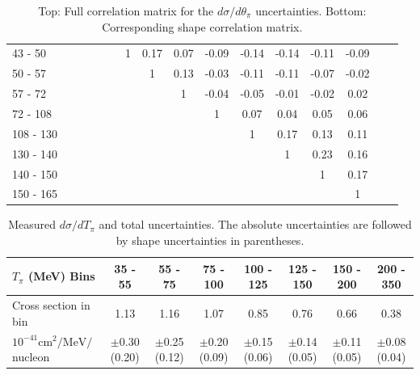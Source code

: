 \begin{table}[ht]
\begin{tabular}{l|ccccccccccccccc}
43 - 50 &  &  &  &  &  & 1 & 0.17 & 0.07 & -0.09 & -0.14 & -0.14 & -0.11 & -0.09 \\ 
50 - 57 &  &  &  &  &  &  & 1 & 0.13 & -0.03 & -0.11 & -0.11 & -0.07 & -0.02 \\ 
57 - 72 &  &  &  &  &  &  &  & 1 & -0.04 & -0.05 & -0.01 & -0.02 & 0.02 \\ 
72 - 108 &  &  &  &  &  &  &  &  & 1 & 0.07 & 0.04 & 0.05 & 0.06 \\ 
108 - 130 &  &  &  &  &  &  &  &  &  & 1 & 0.17 & 0.13 & 0.11 \\ 
130 - 140 &  &  &  &  &  &  &  &  &  &  & 1 & 0.23 & 0.16 \\ 
140 - 150 &  &  &  &  &  &  &  &  &  &  &  & 1 & 0.17 \\ 
150 - 165 &  &  &  &  &  &  &  &  &  &  &  &  & 1 \\ 
\hline\hline
\end{tabular}
\caption{Top: Full correlation matrix for the \cconepi $d\sigma / d\theta_\pi$ uncertainties.  Bottom: Corresponding shape correlation matrix.}
\end{table}
\endgroup


\clearpage
\begingroup
\squeezetable
\begin{table}[h]
\begin{tabular}{l|ccccccc}
\hline\hline
$T_{\pi}$ (MeV) Bins & 35 - 55 & 55 - 75 & 75 - 100 & 100 - 125 & 125 - 150 & 150 - 200 & 200 - 350 \\ 
\hline
Cross section in bin & 1.13 & 1.16 & 1.07 & 0.85 & 0.76 & 0.66 & 0.38 \\ 
$10^{-41}\mathrm{cm}^2/\mathrm{MeV}/$nucleon &  $\pm$0.30 (0.20) &  $\pm$0.25 (0.12) &  $\pm$0.20 (0.09) &  $\pm$0.15 (0.06) &  $\pm$0.14 (0.05) &  $\pm$0.11 (0.05) &  $\pm$0.08 (0.04) \\ 
\hline\hline
\end{tabular}
\caption{Measured \cconepi $d\sigma / dT_\pi$ and total uncertainties.  The absolute uncertainties are followed by shape uncertainties in parentheses.}
\end{table}
\endgroup

